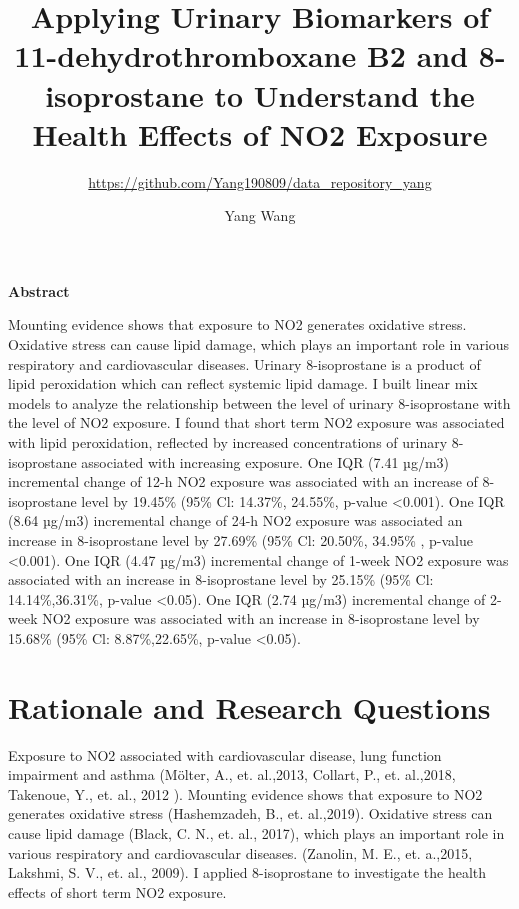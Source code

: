 \documentclass[12pt,]{article}
\title{Applying Urinary Biomarkers of 11-dehydrothromboxane B2 and
8-isoprostane to Understand the Health Effects of NO2 Exposure}
\subtitle{\url{https://github.com/Yang190809/data_repository_yang}}
\author{Yang Wang}
\date{}
\begin{document}
\maketitle

\textbf{Abstract}

Mounting evidence shows that exposure to NO2 generates oxidative stress.
Oxidative stress can cause lipid damage, which plays an important role
in various respiratory and cardiovascular diseases. Urinary
8-isoprostane is a product of lipid peroxidation which can reflect
systemic lipid damage. I built linear mix models to analyze the
relationship between the level of urinary 8-isoprostane with the level
of NO2 exposure. I found that short term NO2 exposure was associated
with lipid peroxidation, reflected by increased concentrations of
urinary 8-isoprostane associated with increasing exposure. One IQR (7.41
µg/m3) incremental change of 12-h NO2 exposure was associated with an
increase of 8-isoprostane level by 19.45\% (95\% Cl: 14.37\%, 24.55\%,
p-value \textless0.001). One IQR (8.64 µg/m3) incremental change of 24-h
NO2 exposure was associated an increase in 8-isoprostane level by
27.69\% (95\% Cl: 20.50\%, 34.95\% , p-value \textless0.001). One IQR
(4.47 µg/m3) incremental change of 1-week NO2 exposure was associated
with an increase in 8-isoprostane level by 25.15\% (95\% Cl:
14.14\%,36.31\%, p-value \textless0.05). One IQR (2.74 µg/m3)
incremental change of 2-week NO2 exposure was associated with an
increase in 8-isoprostane level by 15.68\% (95\% Cl: 8.87\%,22.65\%,
p-value \textless0.05).

\newpage
\tableofcontents

\newpage

\hypertarget{rationale-and-research-questions}{%
\section{Rationale and Research
Questions}\label{rationale-and-research-questions}}

Exposure to NO2 associated with cardiovascular disease, lung function
impairment and asthma (Mölter, A., et. al.,2013, Collart, P., et.
al.,2018, Takenoue, Y., et. al., 2012 ). Mounting evidence shows that
exposure to NO2 generates oxidative stress (Hashemzadeh, B., et.
al.,2019). Oxidative stress can cause lipid damage (Black, C. N., et.
al., 2017), which plays an important role in various respiratory and
cardiovascular diseases. (Zanolin, M. E., et. a.,2015, Lakshmi, S. V.,
et. al., 2009). I applied 8-isoprostane to investigate the health
effects of short term NO2 exposure.
\end{document}
